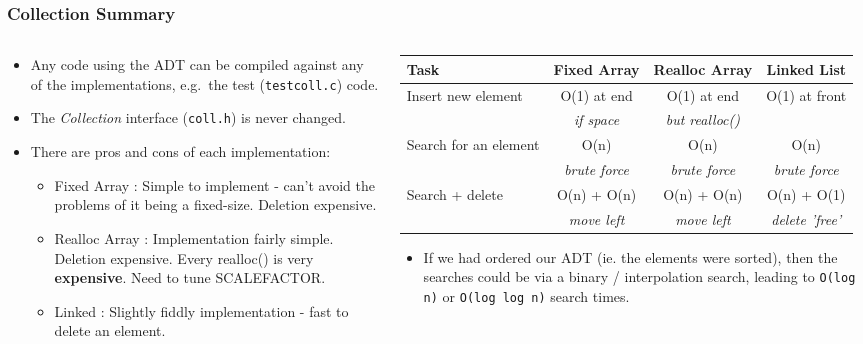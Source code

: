 
\begin{frame}[fragile]
\frametitle{Collection Summary}
\begin{columns}[T]

\begin{column}{0.45\textwidth}
\begin{itemize}[<+->]
\item Any code using the ADT can be compiled against any of the implementations, e.g.~the test (\verb^testcoll.c^) code. 
\item The {\em Collection} interface ({\verb^coll.h^}) is never changed.
\item There are pros and cons of each implementation:
\begin{itemize}
\item Fixed Array : Simple to implement - can't avoid the problems of it being a fixed-size. Deletion expensive.
\item Realloc Array : Implementation fairly simple. Deletion expensive. Every realloc() is very {\bf expensive}. Need to tune SCALEFACTOR.
\item Linked : Slightly fiddly implementation - fast to delete an element.
\end{itemize}
\end{itemize}
\end{column}

\pause
\begin{column}{0.45\textwidth}
{\tiny
\begin{tabular}{|l|c|c|c|}\hline
Task                 & Fixed Array      & Realloc Array      & Linked List        \\\hline
Insert new element   & O(1) at end      & O(1) at end        & O(1) at front      \\
                     & {\em if space}   & {\em but realloc()}&                    \\\hline
Search for an element& O(n)             & O(n)               & O(n)               \\
                     & {\em brute force}& {\em brute force}  & {\em brute force}  \\\hline
Search + delete      & O(n) + O(n)      & O(n) + O(n)        & O(n) + O(1)        \\
                     & {\em move left}  & {\em move left}    & {\em delete 'free'}\\\hline
\end{tabular}
}
\begin{itemize}
\item If we had ordered our ADT (ie. the elements were sorted), then the searches could be via a
binary / interpolation search, leading to \verb^O(log n)^ or \verb^O(log log n)^ search times.
\end{itemize}
\end{column}

\end{columns}
\end{frame}

